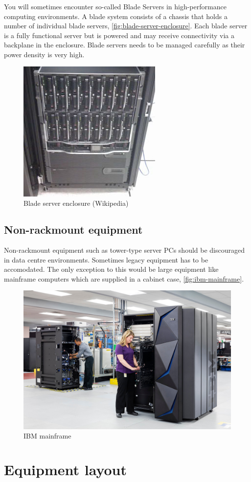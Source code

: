 \documentclass{pgnotes}
\begin{document}
You will sometimes encounter so-called Blade Servers in high-performance computing environments.
A blade system consists of a chassis that holds a number of individual blade servers, \autoref{fig:blade-server-enclosure}.
Each blade server is a fully functional server but is powered and may receive connectivity via a backplane in the enclosure.
Blade servers needs to be managed carefully as their power density is very high.
\begin{figure}[htbp]
  \centering
  \includegraphics[width=0.3\linewidth]{blade_server_enclosure}
  \caption{Blade server enclosure (Wikipedia)}
  \label{fig:blade-server-enclosure}
\end{figure}

\subsection{Non-rackmount equipment}

Non-rackmount equipment such as tower-type server PCs should be discouraged in data centre environments.
Sometimes legacy equipment has to be accomodated.
The only exception to this would be large equipment like mainframe computers which are supplied in a cabinet case, \autoref{fig:ibm-mainframe}.

\begin{figure}[htbp]
  \centering
  \includegraphics[width=0.5\linewidth]{ibm_mainframe}
  \caption{IBM mainframe}
  \label{fig:ibm-mainframe}
\end{figure}


\section{Equipment layout}
\end{document}

